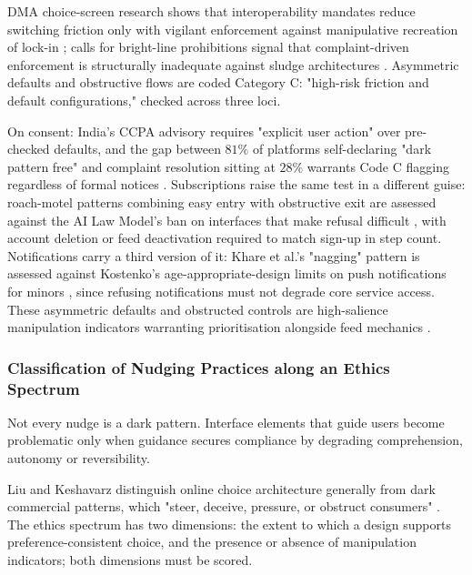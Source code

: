 \documentclass[11pt]{article}
\begin{document}
DMA choice-screen research shows that interoperability mandates reduce switching friction only with vigilant enforcement against manipulative recreation of lock-in \parencites[10]{1070605}; calls for bright-line prohibitions signal that complaint-driven enforcement is structurally inadequate against sludge architectures \parencites[13]{6295677}[14]{6295677}. Asymmetric defaults and obstructive flows are coded Category C: "high-risk friction and default configurations," checked across three loci.

On consent: India's CCPA advisory requires "explicit user action" over pre-checked defaults, and the gap between $81\%$ of platforms self-declaring "dark pattern free" and complaint resolution sitting at $28\%$ warrants Code C flagging regardless of formal notices \parencites[12]{6295677}. Subscriptions raise the same test in a different guise: roach-motel patterns combining easy entry with obstructive exit \parencites[4]{6295677} are assessed against the AI Law Model's ban on interfaces that make refusal difficult \parencites[207]{2977039}, with account deletion or feed deactivation required to match sign-up in step count. Notifications carry a third version of it: Khare et al.'s "nagging" pattern \parencites[14]{6295677} is assessed against Kostenko's age-appropriate-design limits on push notifications for minors \parencites[223]{2977039}, since refusing notifications must not degrade core service access. These asymmetric defaults and obstructed controls are high-salience manipulation indicators warranting prioritisation alongside feed mechanics \parencites[2]{6295677}[31]{9360054}[223]{2977039}.

\subsubsection{Classification of Nudging Practices along an Ethics Spectrum}
\label{sec:classification_nudging_spectrum} Not every nudge is a dark pattern. Interface elements that guide users become problematic only when guidance secures compliance by degrading comprehension, autonomy or reversibility.

Liu and Keshavarz distinguish online choice architecture generally from dark commercial patterns, which "steer, deceive, pressure, or obstruct consumers" \parencites[3]{6087241}. The ethics spectrum has two dimensions: the extent to which a design supports preference-consistent choice, and the presence or absence of manipulation indicators; both dimensions must be scored.
\end{document}
